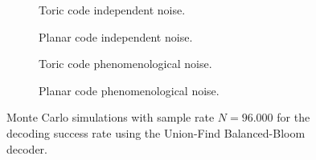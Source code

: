 
\begin{figure}[htbp]
  \centering
  \begin{subfigure}[b]{0.49\textwidth}
    \begin{adjustbox}{Clip=0 1em 0 0}
      
    \end{adjustbox}
    \caption{Toric code independent noise.}
  \end{subfigure}
  \begin{subfigure}[b]{0.49\textwidth}
    \begin{adjustbox}{Clip=0 1em 0 0}
      
    \end{adjustbox}
    \caption{Planar code independent noise.}
  \end{subfigure}
  \begin{subfigure}[b]{0.49\textwidth}
    \begin{adjustbox}{Clip=0 1em 0 0}
      
    \end{adjustbox}
    \caption{Toric code phenomenological noise.}
  \end{subfigure}
  \begin{subfigure}[b]{0.49\textwidth}
    \begin{adjustbox}{Clip=0 1em 0 0}
      
    \end{adjustbox}
    \caption{Planar code phenomenological noise.}
  \end{subfigure}
  \caption{Monte Carlo simulations with sample rate $N=96.000$ for the decoding success rate using the Union-Find Balanced-Bloom decoder.}
  \label{fig:threshold_ufbbsmall}
\end{figure}


